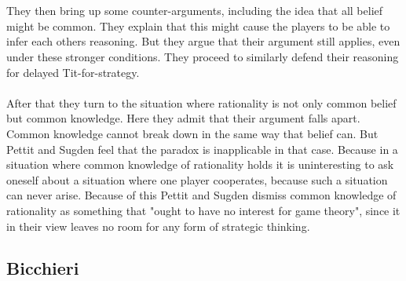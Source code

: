\documentclass{article}
\begin{document}
\\
\\
They then bring up some counter-arguments, including the idea that all belief might be common. They explain that this might cause the players to be able to infer each others reasoning. But they argue that their argument still applies, even under these stronger conditions. They proceed to similarly defend their reasoning for delayed Tit-for-strategy. 
\\
\\
After that they turn to the situation where rationality is not only common belief but common knowledge. Here they admit that their argument falls apart. Common knowledge cannot break down in the same way that belief can. But Pettit and Sugden feel that the paradox is inapplicable in that case. Because in a situation where common knowledge of rationality holds it is uninteresting to ask oneself about a situation where one player cooperates, because such a situation can never arise. Because of this Pettit and Sugden dismiss common knowledge of rationality as something that "ought to have no interest for game theory", since it in their view leaves no room for any form of strategic thinking.















\subsection{Bicchieri}
\end{document}

